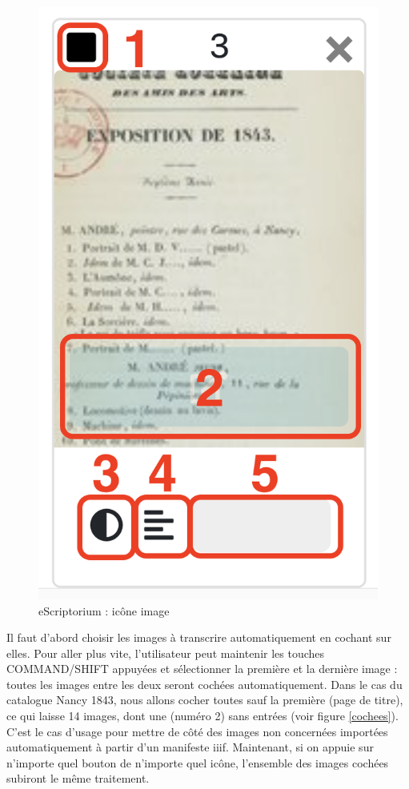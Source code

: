 \documentclass[a4paper,12pt,twoside]{book}
\begin{document}
\begin{figure}[ht]
	\centering
	\includegraphics[scale=0.4]{icone_image_eScriptorium.png}		
	\caption{eScriptorium : icône image}
	\label{image}
\end{figure}

Il faut d'abord choisir les images à transcrire automatiquement en cochant sur elles. Pour aller plus vite, l'utilisateur peut maintenir les touches COMMAND/SHIFT appuyées et sélectionner la première et la dernière image : toutes les images entre les deux seront cochées automatiquement. Dans le cas du catalogue Nancy 1843, nous allons cocher toutes sauf la première (page de titre), ce qui laisse 14 images, dont une (numéro 2) sans entrées (voir figure \ref{cochees}). C'est le cas d'usage pour mettre de côté des images non concernées importées automatiquement à partir d'un manifeste iiif. 
Maintenant, si on appuie sur n'importe quel bouton de n'importe quel icône, l'ensemble des images cochées subiront le même traitement.
 
\end{document}
